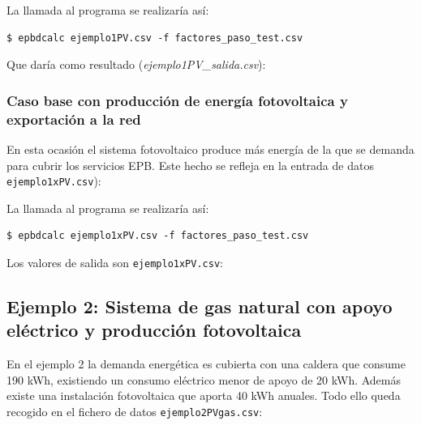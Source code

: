\documentclass[10pt,notitlepage,oneside,a4paper]{article}
\begin{document}

La llamada al programa se realizaría así:

\begin{Verbatim}[fontsize=\small]
    $ epbdcalc ejemplo1PV.csv -f factores_paso_test.csv
\end{Verbatim}

Que daría como resultado (\textit{ejemplo1PV\_salida.csv}):


\subsubsection{Caso base con producción de energía fotovoltaica y exportación a la red}

En esta ocasión el sistema fotovoltaico produce más energía de la que se demanda para cubrir los servicios EPB. Este hecho se refleja en la entrada de datos \texttt{ejemplo1xPV.csv}):


La llamada al programa se realizaría así:

\begin{Verbatim}[fontsize=\small]
    $ epbdcalc ejemplo1xPV.csv -f factores_paso_test.csv
\end{Verbatim}

Los valores de salida son \texttt{ejemplo1xPV.csv}:


\subsection{Ejemplo 2: Sistema de gas natural con apoyo eléctrico y producción fotovoltaica}
En el ejemplo 2 la demanda energética es cubierta con una caldera que consume 190 kWh, existiendo un consumo eléctrico menor de apoyo de 20 kWh. Además existe una instalación fotovoltaica que aporta 40 kWh anuales. Todo ello queda recogido en el fichero de datos \texttt{ejemplo2PVgas.csv}:

\end{document}
